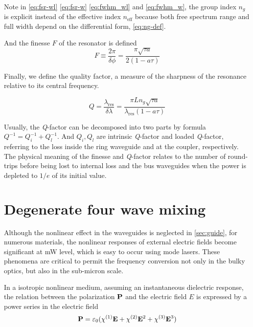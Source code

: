 \documentclass[final]{kuee_en}
\begin{document}
Note in \autoref{eq:fsr-wl} \autoref{eq:fsr-w} \autoref{eq:fwhm_wl} and \autoref{eq:fwhm_w}, the group index $n_g$ is explicit instead of the effective index $n_\mathrm{eff}$ because both free spectrum range and full width depend on the differential form, \autoref{eq:ng-def}.

And the finesse $F$ of the resonator is defined 
\begin{equation}
    F \equiv \frac{2\pi}{\delta\phi} = \frac{\pi\sqrt{\tau a}}{2(1- a \tau)}
\end{equation}

Finally, we define the quality factor, a measure of the sharpness of the resonance relative to its central frequency.

\begin{equation}\label{eq:q-def}
    Q = \frac{\lambda_\mathrm{res}}{\delta \lambda} =  \frac{\pi L n_g \sqrt{\tau a}} {\lambda_\mathrm{res} (1- a \tau)}
\end{equation}

Usually, the \textit{Q}-factor can be decomposed into two parts by formula $Q^{-1}=Q_{i}^{-1} + Q_{l}^{-1}$. And $Q_{i}, Q_{l}$ are intrinsic \textit{Q}-factor and loaded \textit{Q}-factor, referring to the loss inside the ring waveguide and at the coupler, respectively. The physical meaning of the finesse and \textit{Q}-factor relates to the number of round-trips before being lost to internal loss and the bus waveguides when the power is depleted to $1/e$ of its initial value.

\section{Degenerate four wave mixing}

Although the nonlinear effect in the waveguides is neglected in \autoref{sec:guide}, for numerous materials, the nonlinear responses of external electric fields become significant at mW level, which is easy to occur using mode lasers. These phenomena are critical to permit the frequency conversion not only in the bulky optics, but also in the sub-micron scale.

In a isotropic nonlinear medium, assuming an instantaneous dielectric response, the relation between the polarization $\vb{P}$ and the electric field $E$ is expressed by a power series in the electric field
\begin{equation}\label{eq:nlp}
    \vb{P} = \varepsilon_0 \large (\chi^{(1)}\vb{E} + \chi^{(2)}\vb{E}^2 + \chi^{(3)}\vb{E}^3)
\end{equation}
\end{document}
